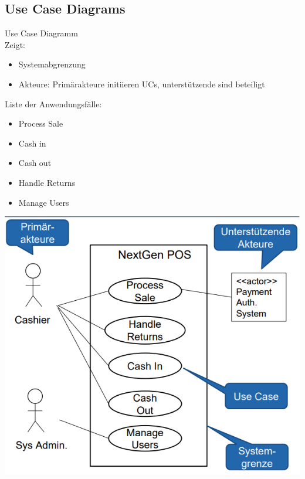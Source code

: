 \subsection{Use Case Diagrams}

\begin{definition}{Use Case Diagramm}\\
    Zeigt:
    \begin{itemize}
        \item Systemabgrenzung
        \item Akteure: Primärakteure initiieren UCs, unterstützende sind beteiligt
    \end{itemize}
    Liste der Anwendungsfälle:
    \begin{itemize}
        \item Process Sale
        \item Cash in
        \item Cash out
        \item Handle Returns
        \item Manage Users
    \end{itemize}
    \includegraphics[width=\linewidth]{uc_diagram.png}
\end{definition}

